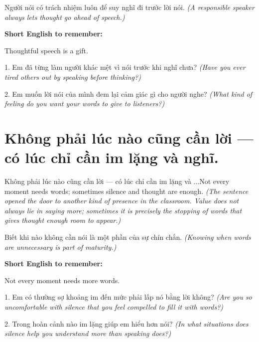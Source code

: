 \begin{baihoc}
Người nói có trách nhiệm luôn để suy nghĩ đi trước lời nói.
\textit{(A responsible speaker always lets thought go ahead of speech.)}
\end{baihoc}

\begin{ghinhoanh}
\textbf{Short English to remember:}

Thoughtful speech is a gift.

\end{ghinhoanh}

\begin{tuhocnhanh}
1. Em đã từng làm người khác mệt vì nói trước khi nghĩ chưa? \textit{(Have you ever tired others out by speaking before thinking?)}

2. Em muốn lời nói của mình đem lại cảm giác gì cho người nghe? \textit{(What kind of feeling do you want your words to give to listeners?)}
\end{tuhocnhanh}
\ngancach


\section{Không phải lúc nào cũng cần lời — có lúc chỉ cần im lặng và nghĩ.}
\begin{truyen}{Không phải lúc nào cũng cần lời — có lúc chỉ cần im lặng và ...}{Not every moment needs words; sometimes silence and thought are enough.}
\textit{(The sentence opened the door to another kind of presence in the classroom. Value does not always lie in saying more; sometimes it is precisely the stopping of words that gives thought enough room to appear.)}
\end{truyen}

\begin{baihoc}
Biết khi nào không cần nói là một phần của sự chín chắn.
\textit{(Knowing when words are unnecessary is part of maturity.)}
\end{baihoc}

\begin{ghinhoanh}
\textbf{Short English to remember:}

Not every moment needs more words.

\end{ghinhoanh}

\begin{tuhocnhanh}
1. Em có thường sợ khoảng im đến mức phải lấp nó bằng lời không? \textit{(Are you so uncomfortable with silence that you feel compelled to fill it with words?)}

2. Trong hoàn cảnh nào im lặng giúp em hiểu hơn nói? \textit{(In what situations does silence help you understand more than speaking does?)}
\end{tuhocnhanh}
\ngancach


